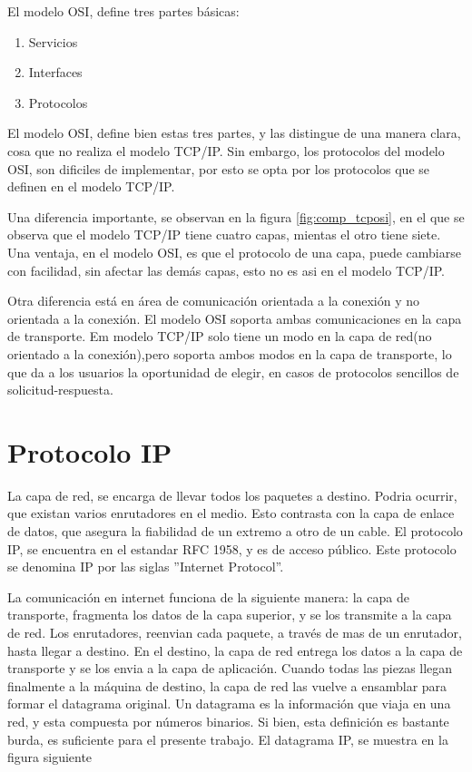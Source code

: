El modelo OSI, define tres partes básicas: 
\begin{enumerate}
	\item Servicios 
	\item Interfaces 
	\item Protocolos
\end{enumerate}

El modelo OSI, define bien estas tres partes, y las distingue de una manera clara, cosa que no realiza el modelo TCP/IP. Sin embargo, los protocolos del modelo OSI, son dificiles de implementar, por esto se opta por los protocolos que se definen en el modelo TCP/IP. 

Una diferencia importante, se observan en la figura \ref{fig:comp_tcposi}, en el que se observa que el modelo TCP/IP tiene cuatro capas, mientas el otro tiene siete. Una ventaja, en el modelo OSI, es que el protocolo de una capa, puede cambiarse con facilidad, sin afectar las demás capas, esto no es asi en el modelo TCP/IP. 

Otra diferencia está en área de comunicación orientada a la conexión y no orientada a la conexión. El modelo OSI soporta ambas comunicaciones en la capa de transporte. Em modelo TCP/IP solo tiene un modo en la capa de red(no orientado a la conexión),pero soporta ambos modos en la capa de transporte, lo que da a los usuarios la oportunidad de elegir, en casos de protocolos sencillos de solicitud-respuesta.  




\section{Protocolo IP} 
La capa de red, se encarga de llevar todos los paquetes a destino. Podria ocurrir, que existan varios enrutadores en el medio. Esto contrasta con la capa de enlace de datos, que asegura la fiabilidad de un extremo a otro de un cable. El protocolo IP, se encuentra en el estandar RFC 1958, y es de acceso público. Este protocolo se denomina IP por las siglas ''Internet Protocol''. 

La comunicación en internet funciona de la siguiente manera: la capa de transporte, fragmenta los datos de la capa superior, y se los transmite a la capa de red. Los enrutadores, reenvian cada paquete, a través de mas de un enrutador, hasta llegar a destino. En el destino, la capa de red entrega los datos a la capa de transporte y se los envia a la capa de aplicación. Cuando todas las piezas llegan finalmente a la máquina de destino, la capa de red las vuelve a ensamblar para formar el datagrama original. Un datagrama es la información que viaja en una red, y esta compuesta por números binarios. Si bien, esta definición es bastante burda, es suficiente para el presente trabajo. El datagrama IP, se muestra en la figura siguiente 

